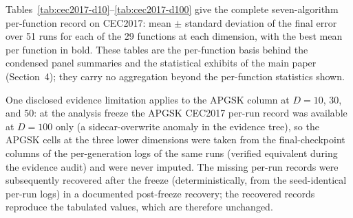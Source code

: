 \documentclass[algorithms,article,submit,moreauthors,pdftex]{Definitions/mdpi}
\newcommand{\apgsk}{APGSK}
\begin{document}
Tables~\ref{tab:cec2017-d10}--\ref{tab:cec2017-d100} give the complete
seven-algorithm per-function record on CEC2017: mean $\pm$ standard deviation
of the final error over 51 runs for each of the 29 functions at each
dimension, with the best mean per function in bold.
These tables are the per-function basis behind the condensed panel
summaries and the statistical exhibits of the main paper (Section~4);
they carry no aggregation beyond the per-function statistics shown.

One disclosed evidence limitation applies to the \apgsk{} column at
$D = 10$, $30$, and $50$: at the analysis freeze the \apgsk{} CEC2017
per-run record was available at $D = 100$ only (a sidecar-overwrite
anomaly in the evidence tree), so the \apgsk{} cells at the three lower
dimensions were taken from the final-checkpoint columns of the
per-generation logs of the same runs (verified equivalent during the
evidence audit) and were never imputed. The missing per-run records
were subsequently recovered after the freeze (deterministically,
from the seed-identical per-run logs) in a documented post-freeze recovery;
the recovered records reproduce the tabulated values, which are
therefore unchanged.

\begin{table}[p]
\caption{CEC2017 at $D = 10$: mean $\pm$ SD of the final error over 51
runs for all 7 GSK-family algorithms on each of the 29 functions (F1,
F3--F30; success floor $10^{-8}$); best mean per function in bold.
  \apgsk{} cells
derive from the final-checkpoint columns of the per-generation logs
(per-run file unavailable at this dimension at the analysis freeze;
recovered post-freeze, values unchanged; never
imputed).}\label{tab:cec2017-d10}
\centering
\tablesize{\footnotesize}
\resizebox{\textwidth}{!}{}
\end{table}

\begin{table}[p]
\caption{CEC2017 at $D = 30$: mean $\pm$ SD of the final error over 51
runs for all 7 GSK-family algorithms on each of the 29 functions (F1,
F3--F30; success floor $10^{-8}$); best mean per function in bold.
  \apgsk{} cells
derive from the final-checkpoint columns of the per-generation logs
(per-run file unavailable at this dimension at the analysis freeze;
recovered post-freeze, values unchanged; never
imputed).}\label{tab:cec2017-d30}
\centering
\tablesize{\footnotesize}
\resizebox{\textwidth}{!}{}
\end{table}
\end{document}
